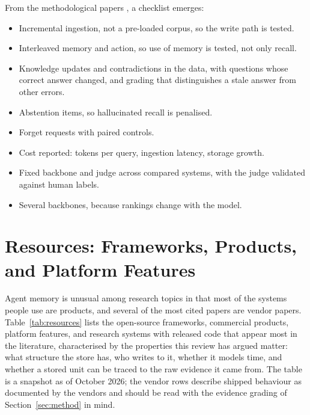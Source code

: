 \documentclass[11pt]{article}
\begin{document}
From the methodological papers \citep{hu2025memoryagentbench,jiang2026anatomy,he2026memoryarena,zhao2026amabench,xie2026bemula,fan2026statemem}, a checklist emerges:
\begin{itemize}
\item Incremental ingestion, not a pre-loaded corpus, so the write path is tested.
\item Interleaved memory and action, so use of memory is tested, not only recall.
\item Knowledge updates and contradictions in the data, with questions whose correct answer changed, and grading that distinguishes a stale answer from other errors.
\item Abstention items, so hallucinated recall is penalised.
\item Forget requests with paired controls.
\item Cost reported: tokens per query, ingestion latency, storage growth.
\item Fixed backbone and judge across compared systems, with the judge validated against human labels.
\item Several backbones, because rankings change with the model.
\end{itemize}

\section{Resources: Frameworks, Products, and Platform Features}
\label{sec:resources}

Agent memory is unusual among research topics in that most of the systems people use are products, and several of the most cited papers are vendor papers. Table~\ref{tab:resources} lists the open-source frameworks, commercial products, platform features, and research systems with released code that appear most in the literature, characterised by the properties this review has argued matter: what structure the store has, who writes to it, whether it models time, and whether a stored unit can be traced to the raw evidence it came from. The table is a snapshot as of October 2026; the vendor rows describe shipped behaviour as documented by the vendors and should be read with the evidence grading of Section~\ref{sec:method} in mind.
\end{document}
